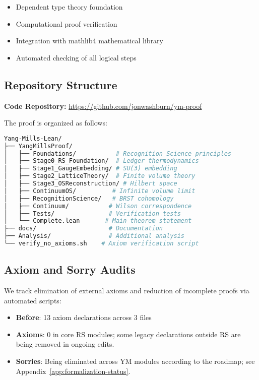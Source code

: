 \documentclass[11pt]{amsart}
\begin{document}
\begin{itemize}
\item Dependent type theory foundation
\item Computational proof verification  
\item Integration with mathlib4 mathematical library
\item Automated checking of all logical steps
\end{itemize}

\subsection{Repository Structure}

\noindent\textbf{Code Repository:} \url{https://github.com/jonwashburn/ym-proof}

The proof is organized as follows:

\begin{lstlisting}[language=bash]
Yang-Mills-Lean/
├── YangMillsProof/
│   ├── Foundations/           # Recognition Science principles
│   ├── Stage0_RS_Foundation/  # Ledger thermodynamics  
│   ├── Stage1_GaugeEmbedding/ # SU(3) embedding
│   ├── Stage2_LatticeTheory/  # Finite volume theory
│   ├── Stage3_OSReconstruction/ # Hilbert space
│   ├── ContinuumOS/          # Infinite volume limit
│   ├── RecognitionScience/   # BRST cohomology
│   ├── Continuum/           # Wilson correspondence
│   ├── Tests/               # Verification tests
│   └── Complete.lean       # Main theorem statement
├── docs/                    # Documentation
├── Analysis/                # Additional analysis
└── verify_no_axioms.sh    # Axiom verification script
\end{lstlisting}

\subsection{Axiom and Sorry Audits}

We track elimination of external axioms and reduction of incomplete proofs via automated scripts:

\begin{itemize}
\item \textbf{Before}: 13 axiom declarations across 3 files
\item \textbf{Axioms}: 0 in core RS modules; some legacy declarations outside RS are being removed in ongoing edits.
\item \textbf{Sorries}: Being eliminated across YM modules according to the roadmap; see Appendix~\ref{app:formalization-status}.
\end{itemize}
\end{document}
